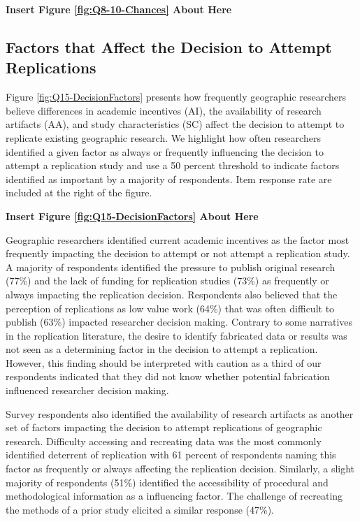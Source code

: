 \documentclass[]{interact}
\theoremstyle{plain}%
\theoremstyle{definition}
\theoremstyle{remark}
\begin{document}
\begin{center}
\textbf{Insert Figure \ref{fig:Q8-10-Chances} About Here}
\end{center}

\subsection*{Factors that Affect the Decision to Attempt Replications}
Figure \ref{fig:Q15-DecisionFactors} presents how frequently geographic researchers believe differences in academic incentives (AI), the availability of research artifacts (AA), and study characteristics (SC) affect the decision to attempt to replicate existing geographic research.
We highlight how often researchers identified a given factor as always or frequently influencing the decision to attempt a replication study and use a 50 percent threshold to indicate factors identified as important by a majority of respondents. 
Item response rate are included at the right of the figure.

\begin{center}
\textbf{Insert Figure \ref{fig:Q15-DecisionFactors} About Here}
\end{center}

Geographic researchers identified current academic incentives as the factor most frequently impacting the decision to attempt or not attempt a replication study. 
A majority of respondents identified the pressure to publish original research (77\%) and the lack of funding for replication studies (73\%) as frequently or always impacting the replication decision.
Respondents also believed that the perception of replications as low value work (64\%) that was often difficult to publish (63\%) impacted researcher decision making.  
Contrary to some narratives in the replication literature, the desire to identify fabricated data or results was not seen as a determining factor in the decision to attempt a replication. 
However, this finding should be interpreted with caution as a third of our respondents indicated that they did not know whether potential fabrication influenced researcher decision making.  

Survey respondents also identified the availability of research artifacts as another set of factors impacting the decision to attempt replications of geographic research.
Difficulty accessing and recreating data was the most commonly identified deterrent of replication with 61 percent of respondents naming this factor as frequently or always affecting the replication decision.
Similarly, a slight majority of respondents (51\%) identified the accessibility of procedural and methodological information as a influencing factor. 
The challenge of recreating the methods of a prior study elicited a similar response (47\%).
\end{document}
